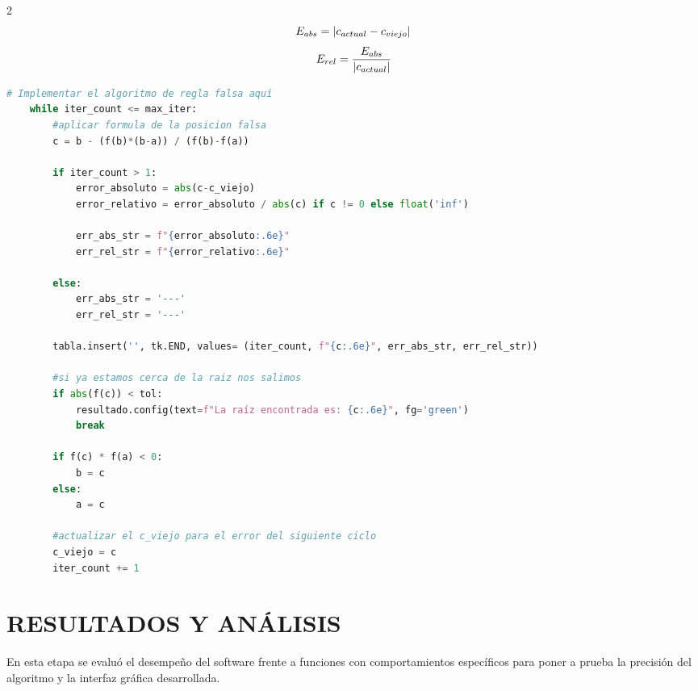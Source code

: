\documentclass{rmf-d}
\begin{document}
\begin{multicols}{2}
\begin{equation}
    E_{abs} = \abs{c_{actual}- c_{viejo}}
\end{equation}
\begin{equation}
    E_{rel}=\frac{E_{abs}}{\abs{c_{actual}}}
\end{equation}
\begin{lstlisting}[language=Python, caption=Algoritmo de Regla Falsa y cálculo de errores]
    # Implementar el algoritmo de regla falsa aquí
    while iter_count <= max_iter:
        #aplicar formula de la posicion falsa
        c = b - (f(b)*(b-a)) / (f(b)-f(a))
        
        if iter_count > 1:
            error_absoluto = abs(c-c_viejo)
            error_relativo = error_absoluto / abs(c) if c != 0 else float('inf')
            
            err_abs_str = f"{error_absoluto:.6e}"
            err_rel_str = f"{error_relativo:.6e}"
            
        else:
            err_abs_str = '---'
            err_rel_str = '---'
            
        tabla.insert('', tk.END, values= (iter_count, f"{c:.6e}", err_abs_str, err_rel_str))
        
        #si ya estamos cerca de la raiz nos salimos
        if abs(f(c)) < tol:
            resultado.config(text=f"La raíz encontrada es: {c:.6e}", fg='green')
            break 
        
        if f(c) * f(a) < 0:
            b = c 
        else:
            a = c 
            
        #actualizar el c_viejo para el error del siguiente ciclo
        c_viejo = c 
        iter_count += 1
\end{lstlisting}























\section{RESULTADOS Y ANÁLISIS}
\label{sec:4}
En esta etapa se evaluó el desempeño del software frente a funciones con comportamientos específicos para poner a prueba la precisión del algoritmo y la interfaz gráfica desarrollada.


\end{multicols}
\end{document}
